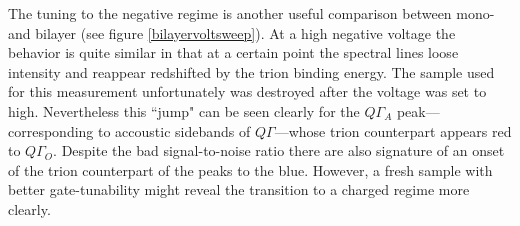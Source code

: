 The tuning to the negative regime is another useful comparison between mono- and bilayer \wse (see figure \ref{bilayervoltsweep}). At a high negative voltage the behavior is quite similar in that at a certain point the spectral lines loose intensity and reappear redshifted by the trion binding energy. The sample used for this measurement unfortunately was destroyed after the voltage was set to high. Nevertheless this ``jump" can be seen clearly for the $Q\Gamma_A$ peak---corresponding to accoustic sidebands of $Q\Gamma$---whose trion counterpart appears red to $Q\Gamma_O$. Despite the bad signal-to-noise ratio there are also signature of an onset of the trion counterpart of the peaks to the blue. However, a fresh sample with better gate-tunability might reveal the transition to a charged regime more clearly. 
